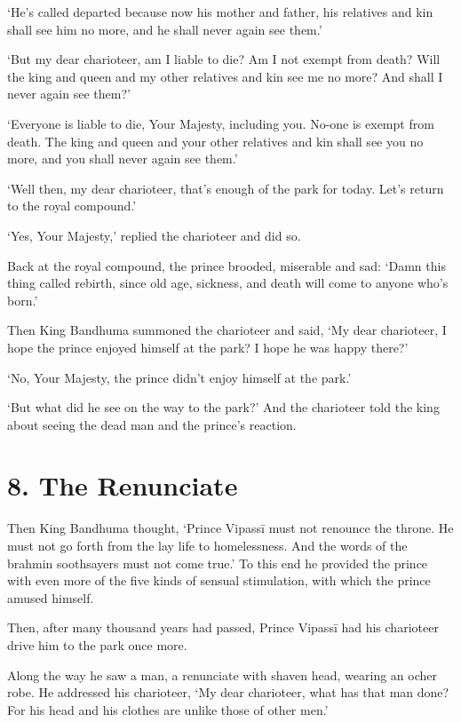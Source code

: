 \documentclass[12pt,openany]{book}%
\begin{document}
‘He’s called departed because now his mother and father, his relatives and kin shall see him no more, and he shall never again see them.’ 

‘But my dear charioteer, am I liable to die? Am I not exempt from death? Will the king and queen and my other relatives and kin see me no more? And shall I never again see them?’ 

‘Everyone is liable to die, Your Majesty, including you. No-one is exempt from death. The king and queen and your other relatives and kin shall see you no more, and you shall never again see them.’ 

‘Well then, my dear charioteer, that’s enough of the park for today. Let’s return to the royal compound.’ 

‘Yes, Your Majesty,’ replied the charioteer and did so. 

Back at the royal compound, the prince brooded, miserable and sad: ‘Damn this thing called rebirth, since old age, sickness, and death will come to anyone who’s born.’ 

Then King Bandhuma summoned the charioteer and said, ‘My dear charioteer, I hope the prince enjoyed himself at the park? I hope he was happy there?’ 

‘No, Your Majesty, the prince didn’t enjoy himself at the park.’ 

‘But what did he see on the way to the park?’ And the charioteer told the king about seeing the dead man and the prince’s reaction. 

\section*{8. The Renunciate }

Then King Bandhuma thought, ‘Prince \textsanskrit{Vipassī} must not renounce the throne. He must not go forth from the lay life to homelessness. And the words of the brahmin soothsayers must not come true.’ To this end he provided the prince with even more of the five kinds of sensual stimulation, with which the prince amused himself. 

Then, after many thousand years had passed, Prince \textsanskrit{Vipassī} had his charioteer drive him to the park once more. 

Along the way he saw a man, a renunciate with shaven head, wearing an ocher robe. He addressed his charioteer, ‘My dear charioteer, what has that man done? For his head and his clothes are unlike those of other men.’ 
\end{document}
